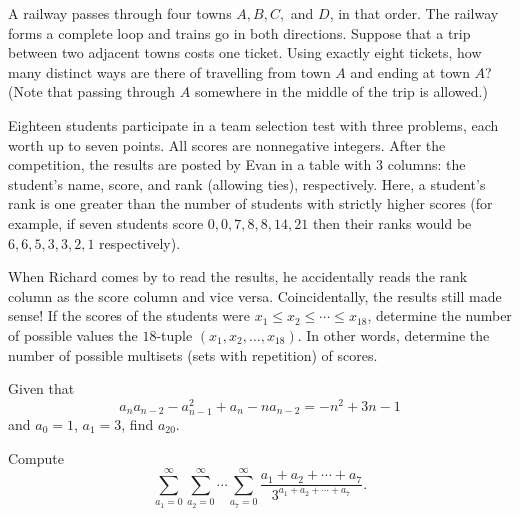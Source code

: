 \documentclass[11pt,paper=letter]{scrartcl}
\begin{document}
\begin{mdframed}[style=exmdbox]


\begin{problem}
  A railway passes through four towns $A, B, C,$ and $D$, in that order. The railway forms a complete loop and trains go in both directions. Suppose that a trip between two adjacent towns costs one ticket. Using exactly eight tickets, how many distinct ways are there of travelling from town $A$ and ending at town $A$? (Note that passing through $A$ somewhere in the middle of the trip is allowed.)
\end{problem}

\begin{problem}
Eighteen students participate in a team selection test with three problems, each worth up to seven points. All scores are nonnegative integers. After the competition, the results are posted by Evan in a table with 3 columns: the student's name, score, and rank (allowing ties), respectively. Here, a student's rank is one greater than the number of students with strictly higher scores (for example, if seven students score $0, 0, 7, 8, 8, 14, 21$ then their ranks would be $6, 6, 5, 3, 3, 2, 1$ respectively).

When Richard comes by to read the results, he accidentally reads the rank column as the score column and vice versa. Coincidentally, the results still made sense! If the scores of the students were $x_1 \le x_2 \le \cdots \le x_{18}$, determine the number of possible values the $18$-tuple $(x_1, x_2, \ldots, x_{18})$. In other words, determine the number of possible multisets (sets with repetition) of scores.
\end{problem}

\begin{problem}
  Given that \[a_na_{n-2} - a_{n-1}^2 + a_n - na_{n-2} = -n^2 + 3n - 1\] and $a_0 = 1$, $a_1 = 3$, find $a_{20}$. \hint{\ref{h:3}}
\end{problem}

\begin{problem}
  Compute
  \[
  \sum_{a_1 = 0}^{\infty} \sum_{a_2 = 0}^{\infty} \cdots \sum_{a_7 = 0}^{\infty} \frac{a_1 + a_2 + \cdots + a_7}{3^{a_1 + a_2 + \cdots + a_7}}.
  \]
\end{problem}

\end{mdframed}
\end{document}

